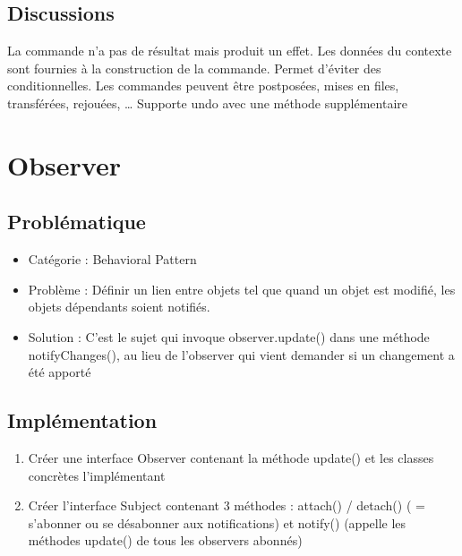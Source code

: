 \subsection{Discussions}

La commande n'a pas de résultat mais produit un effet. Les données du contexte sont fournies à la construction de la commande. Permet d'éviter des conditionnelles. Les commandes peuvent être postposées, mises en files, transférées, rejouées, … Supporte undo avec une méthode supplémentaire









\section{Observer}
\subsection{Problématique}
\begin{itemize}
    \item Catégorie : Behavioral Pattern
    \item Problème : Définir un lien entre objets tel que quand un objet est modifié, les objets dépendants soient notifiés. 
    \item Solution : C'est le sujet qui invoque observer.update() dans une méthode notifyChanges(), au lieu de l'observer qui vient demander si un changement a été apporté
\end{itemize}
\subsection{Implémentation}
\begin{enumerate}
    \item Créer une interface Observer contenant la méthode update() et les classes concrètes l'implémentant
    \item Créer l’interface Subject contenant 3 méthodes : attach() / detach() ( = s'abonner ou se désabonner aux notifications) et notify() (appelle les méthodes update() de tous les observers abonnés)
    

\end{enumerate}

